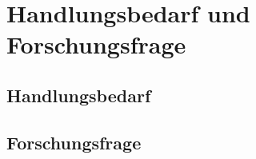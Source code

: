 \chapter{Handlungsbedarf und Forschungsfrage}\label{chap:handlungsbedarf_und_forschungsfrage}

\section{Handlungsbedarf}

\section{Forschungsfrage}











